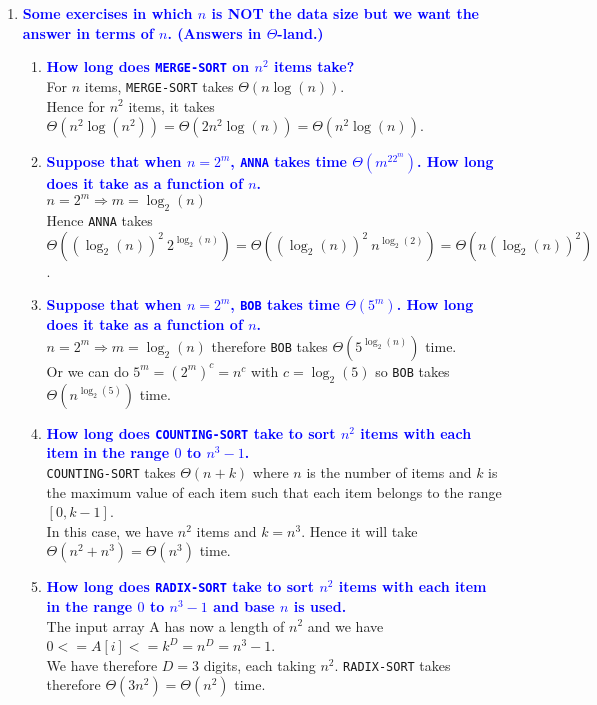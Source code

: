 \documentclass[11pt]{article}
\begin{document}
\begin{enumerate}
\item \textbf{\textcolor{blue}{Some exercises in which $n$ is NOT the data size but we want
the answer in terms of $n$.  (Answers in $\Theta$-land.)}}
    \begin{enumerate}
    \item \textbf{\textcolor{blue}{How long does {\tt MERGE-SORT} on $n^2$ items take?}}
        \\ For $n$ items, {\tt MERGE-SORT} takes $\Theta(n\log(n))$.
        \\ Hence for $n^2$ items, it takes $\Theta(n^2 \log(n^2)) = \Theta(2n^2 \log(n)) = \Theta(n^2 \log(n))$.
    \item \textbf{\textcolor{blue}{Suppose that when $n=2^m$, {\tt ANNA} takes time $\Theta(m^22^m)$.
    How long does it take as a function of $n$.}}
        \\ $n=2^m \Rightarrow m=\log_2(n)$
        \\ Hence {\tt ANNA} takes $\Theta((\log_2(n))^2\ 2^{\log_2(n)}) = \Theta((\log_2(n))^2\ n^{\log_2(2)}) = \Theta(n(\log_2(n))^2)$.
    \item \textbf{\textcolor{blue}{Suppose that when $n=2^m$, {\tt BOB} takes time $\Theta(5^m)$.
    How long does it take as a function of $n$.}}
        \\ $n=2^m \Rightarrow m=\log_2(n)$ therefore {\tt BOB} takes $\Theta(5^{\log_2(n)})$ time.
        \\ Or we can do $5^m = (2^{m})^c = n^c$ with $c = \log_2(5)$ so {\tt BOB} takes $\Theta(n^{\log_2(5)})$ time.
    \item \textbf{\textcolor{blue}{How long does {\tt COUNTING-SORT} take to sort $n^2$ items with
    each item in the range $0$ to $n^3-1$.}}
        \\ {\tt COUNTING-SORT} takes $\Theta(n+k)$ where $n$ is the number of items and $k$ is the maximum value of each item such that each item belongs to the range $[0, k-1]$.
        \\ In this case, we have $n^2$ items and $k = n^3$. Hence it will take $\Theta(n^2 + n^3) = \Theta(n^3)$ time.
    \item \textbf{\textcolor{blue}{How long does {\tt RADIX-SORT} take to sort $n^2$ items with
    each item in the range $0$ to $n^3-1$ and base $n$ is used.}}
        \\ The input array A has now a length of $n^2$ and we have $0 <= A[i] <= k^D = n^D = n^3 - 1$.
        \\ We have therefore $D = 3$ digits, each taking $n^2$. {\tt RADIX-SORT} takes therefore $\Theta(3n^2) = \Theta(n^2)$ time.

\end{enumerate}
\end{enumerate}
\end{document}
